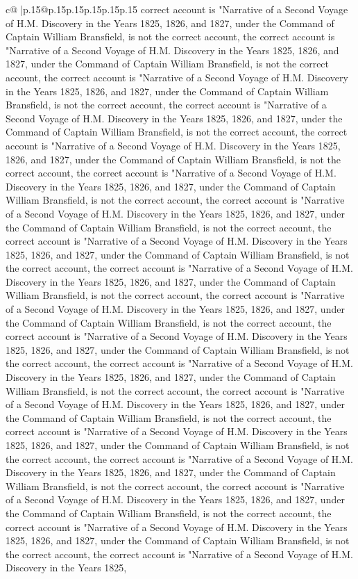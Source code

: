 \documentclass{article}
\begin{document}
{\begin{supertabular}{c@{$\;$}|p{.15\linewidth}@{}p{.15\linewidth}p{.15\linewidth}p{.15\linewidth}p{.15\linewidth}p{.15\linewidth}}
{{{correct account is "Narrative of a Second Voyage of H.M. Discovery in the Years 1825, 1826, and 1827, under the Command of Captain William Bransfield, is not the correct account, the correct account is "Narrative of a Second Voyage of H.M. Discovery in the Years 1825, 1826, and 1827, under the Command of Captain William Bransfield, is not the correct account, the correct account is "Narrative of a Second Voyage of H.M. Discovery in the Years 1825, 1826, and 1827, under the Command of Captain William Bransfield, is not the correct account, the correct account is "Narrative of a Second Voyage of H.M. Discovery in the Years 1825, 1826, and 1827, under the Command of Captain William Bransfield, is not the correct account, the correct account is "Narrative of a Second Voyage of H.M. Discovery in the Years 1825, 1826, and 1827, under the Command of Captain William Bransfield, is not the correct account, the correct account is "Narrative of a Second Voyage of H.M. Discovery in the Years 1825, 1826, and 1827, under the Command of Captain William Bransfield, is not the correct account, the correct account is "Narrative of a Second Voyage of H.M. Discovery in the Years 1825, 1826, and 1827, under the Command of Captain William Bransfield, is not the correct account, the correct account is "Narrative of a Second Voyage of H.M. Discovery in the Years 1825, 1826, and 1827, under the Command of Captain William Bransfield, is not the correct account, the correct account is "Narrative of a Second Voyage of H.M. Discovery in the Years 1825, 1826, and 1827, under the Command of Captain William Bransfield, is not the correct account, the correct account is "Narrative of a Second Voyage of H.M. Discovery in the Years 1825, 1826, and 1827, under the Command of Captain William Bransfield, is not the correct account, the correct account is "Narrative of a Second Voyage of H.M. Discovery in the Years 1825, 1826, and 1827, under the Command of Captain William Bransfield, is not the correct account, the correct account is "Narrative of a Second Voyage of H.M. Discovery in the Years 1825, 1826, and 1827, under the Command of Captain William Bransfield, is not the correct account, the correct account is "Narrative of a Second Voyage of H.M. Discovery in the Years 1825, 1826, and 1827, under the Command of Captain William Bransfield, is not the correct account, the correct account is "Narrative of a Second Voyage of H.M. Discovery in the Years 1825, 1826, and 1827, under the Command of Captain William Bransfield, is not the correct account, the correct account is "Narrative of a Second Voyage of H.M. Discovery in the Years 1825, 1826, and 1827, under the Command of Captain William Bransfield, is not the correct account, the correct account is "Narrative of a Second Voyage of H.M. Discovery in the Years 1825, 1826, and 1827, under the Command of Captain William Bransfield, is not the correct account, the correct account is "Narrative of a Second Voyage of H.M. Discovery in the Years 1825, 1826, and 1827, under the Command of Captain William Bransfield, is not the correct account, the correct account is "Narrative of a Second Voyage of H.M. Discovery in the Years 1825, }}}
\end{supertabular}}
\end{document}
